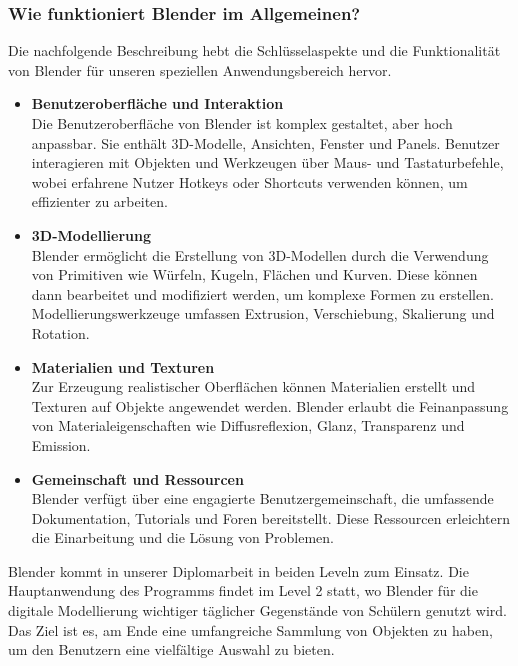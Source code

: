 \subsubsection{Wie funktioniert Blender im Allgemeinen?}

Die nachfolgende Beschreibung hebt die Schlüsselaspekte und die Funktionalität von Blender für unseren speziellen
Anwendungsbereich hervor.

\begin{itemize}
    \item \textbf{Benutzeroberfläche und Interaktion}\\
    Die Benutzeroberfläche von Blender ist komplex gestaltet, aber hoch anpassbar. Sie enthält 3D-Modelle,
    Ansichten, Fenster und Panels. Benutzer interagieren mit Objekten und Werkzeugen über Maus- und Tastaturbefehle,
    wobei erfahrene Nutzer Hotkeys oder Shortcuts verwenden können, um effizienter zu arbeiten.

    \item \textbf{3D-Modellierung}\\
    Blender ermöglicht die Erstellung von 3D-Modellen durch die Verwendung von Primitiven wie Würfeln, Kugeln,
    Flächen und Kurven. Diese können dann bearbeitet und modifiziert werden, um komplexe Formen zu erstellen.
    Modellierungswerkzeuge umfassen Extrusion, Verschiebung, Skalierung und Rotation.

    \item \textbf{Materialien und Texturen}\\
    Zur Erzeugung realistischer Oberflächen können Materialien erstellt und Texturen auf Objekte angewendet werden.
    Blender erlaubt die Feinanpassung von Materialeigenschaften wie Diffusreflexion, Glanz, Transparenz und Emission.

    \item \textbf{Gemeinschaft und Ressourcen}\\
    Blender verfügt über eine engagierte Benutzergemeinschaft, die umfassende Dokumentation, Tutorials und Foren
    bereitstellt. Diese Ressourcen erleichtern die Einarbeitung und die Lösung von Problemen.

\end{itemize}
Blender kommt in unserer Diplomarbeit in beiden Leveln zum Einsatz. Die Hauptanwendung des Programms findet im Level 2
statt, wo Blender für die digitale Modellierung wichtiger täglicher Gegenstände von Schülern genutzt wird. Das Ziel ist
es, am Ende eine umfangreiche Sammlung von Objekten zu haben, um den Benutzern eine vielfältige Auswahl zu bieten.